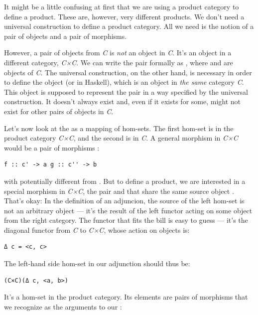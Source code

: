 \noindent
It might be a little confusing at first that we are using a product
category to define a product. These are, however, very different
products. We don't need a universal construction to define a product
category. All we need is the notion of a pair of objects and a pair of
morphisms.

However, a pair of objects from \emph{C} is \emph{not} an object in
\emph{C}. It's an object in a different category, \emph{C×C}. We can
write the pair formally as ,
where  and  are objects of \emph{C}. The universal
construction, on the other hand, is necessary in order to define the
object  (or  in Haskell), which is an object
in \emph{the same} category \emph{C}. This object is supposed to
represent the pair  in a way
specified by the universal construction. It doesn't always exist and,
even if it exists for some, might not exist for other pairs of objects
in \emph{C}.

Let's now look at the  as a mapping of hom-sets. The
first hom-set is in the product category \emph{C×C}, and the second is
in \emph{C}. A general morphism in \emph{C×C} would be a pair of
morphisms :

\begin{Verbatim}[commandchars=\\\{\}]
f :: c' -> a g :: c'' -> b
\end{Verbatim}
with  potentially different from
. But to define a product, we are interested in a
special morphism in \emph{C×C}, the pair  and  that
share the same source object . That's okay: In the definition
of an adjuncion, the source of the left hom-set is not an arbitrary
object --- it's the result of the left functor  acting on some
object from the right category. The functor that fits the bill is easy
to guess --- it's the diagonal functor from \emph{C} to \emph{C×C},
whose action on objects is:

\begin{Verbatim}[commandchars=\\\{\}]
Δ c = <c, c>
\end{Verbatim}
The left-hand side hom-set in our adjunction should thus be:

\begin{Verbatim}[commandchars=\\\{\}]
(C×C)(Δ c, <a, b>)
\end{Verbatim}
It's a hom-set in the product category. Its elements are pairs of
morphisms that we recognize as the arguments to our :


